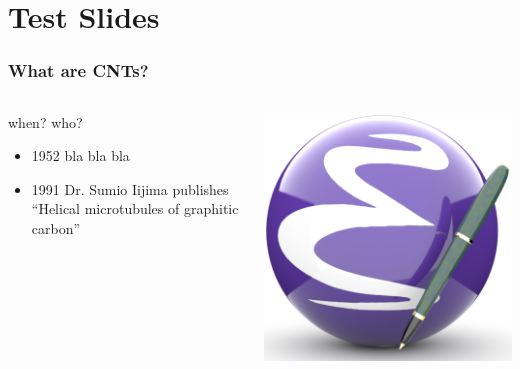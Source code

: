\documentclass[t,10pt]{beamer}
\begin{document}
\section{Test Slides}
\label{sec-6}
\begin{frame}
\frametitle{What are CNTs?}
\label{sec-6-1}
\begin{columns}
\begin{column}{0.6\textwidth}
\begin{block}{when? who?}
\label{sec-6-1-1}

\begin{itemize}
\item 1952 bla bla bla
\item 1991 Dr. Sumio Iijima publishes ``Helical microtubules of graphitic carbon''
\end{itemize}
\end{block}
\end{column}
\begin{column}{0.4\textwidth}
\label{sec-6-1-2}

    \includegraphics[width=\textwidth]{./emacs5-512.png}
\end{column}
\end{columns}
\end{frame}
\end{document}
